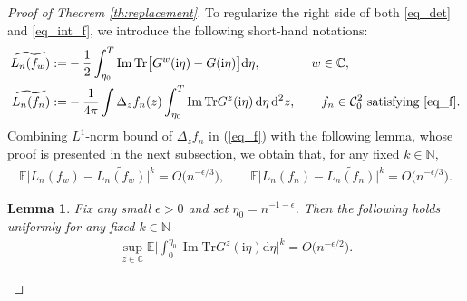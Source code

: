 \documentclass[10pt,reqno]{amsart}
\numberwithin{equation}{section}
\numberwithin{figure}{section}
\theoremstyle{plain}
\newtheorem{lemma}[theorem]{Lemma}
\newcommand{\N}{{\mathbb{N}}}
\newcommand{\C}{{\mathbb{C}}}
\newcommand{\ii}{\mathrm{i}}
\newcommand{\wt}{\widetilde}
\newcommand{\<}{\langle}
\renewcommand{\>}{\rangle}
\newcommand{\E}{\mathbb{E}}
\newcommand{\dd}{\operatorname{d}\!{}}
\renewcommand{\Im}{\operatorname{Im}}
\begin{document}
\begin{proof}[Proof of Theorem \ref{th:replacement}]
\medskip

To regularize the right side of both \eqref{eq_det} and \eqref{eq_int_f}, we introduce the following short-hand notations:
\begin{align}
\wt{L_n(f_w)}:=&-\frac{1}{2}\int_{\eta_0}^{T} \Im \mathrm{Tr} \big[ G^{w}(\ii \eta)-G(\ii \eta)\big] \mathrm{d} \eta, \qquad \qquad w\in \C, \label{eq_regular1}\\
\wt{L_n(f_n)}:=&-\frac{1}{4\pi} \int \Delta_z f_n(z) \int_{\eta_0}^{T} \Im \mathrm{Tr} G^{z}(\ii \eta) \dd \eta \dd^2 z, \qquad f_n\in \mathcal{C}_0^2 \mbox{~satisfying~} \eqref{eq_f}.\label{eq_regular2}
\end{align}
Combining $L^{1}$-norm bound of $\Delta_z f_n$ in (\ref{eq_f}) with the following lemma, whose proof is presented in the next subsection, we obtain that, for any fixed $k \in \N$,
\begin{align}\label{eq_lemma_tiny}
	\E \Big| L_n(f_w)-\wt{L_n(f_w)}\Big|^k=O\big( n^{-\epsilon/3}\big), \qquad \E \Big| L_n(f_n)-\wt{L_n(f_n)}\Big|^k=O\big( n^{-\epsilon/3}\big).
\end{align}
%
\begin{lemma}\label{lemma_tiny}
Fix any small $\epsilon>0$ and set $\eta_0=n^{-1-\epsilon}$. Then the following holds uniformly for any fixed $k \in \N$
\begin{align}\label{eq_small}
	\sup_{z\in \C}\mathbb{E} \Big| \int_{0}^{\eta_0}\Im \mathrm{Tr} G^z (\ii \eta) \mathrm{d} \eta \Big|^k=O\big( n^{-\epsilon/2}\big).
\end{align}
 \end{lemma}
%
%
%






\end{proof}
\end{document}
